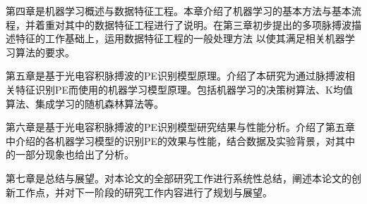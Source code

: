 第四章是机器学习概述与数据特征工程。本章介绍了机器学习的基本方法与基本流程，并着重对其中的数据特征工程进行了说明。在第三章初步提出的多项脉搏波描述特征的工作基础上，运用数据特征工程的一般处理方法
以使其满足相关机器学习算法的要求。

第五章是基于光电容积脉搏波的PE识别模型原理。介绍了本研究为通过脉搏波相关特征识别PE而使用的机器学习模型原理。包括机器学习的决策树算法、K均值算法、集成学习的随机森林算法等。

第六章是基于光电容积脉搏波的PE识别模型研究结果与性能分析。介绍了第五章中介绍的各机器学习模型的识别PE的效果与性能，结合数据及实验背景，对其中的一部分现象也给出了分析。

第七章是总结与展望。对本论文的全部研究工作进行系统性总结，阐述本论文的创新工作点，并对下一阶段的研究工作内容进行了规划与展望。